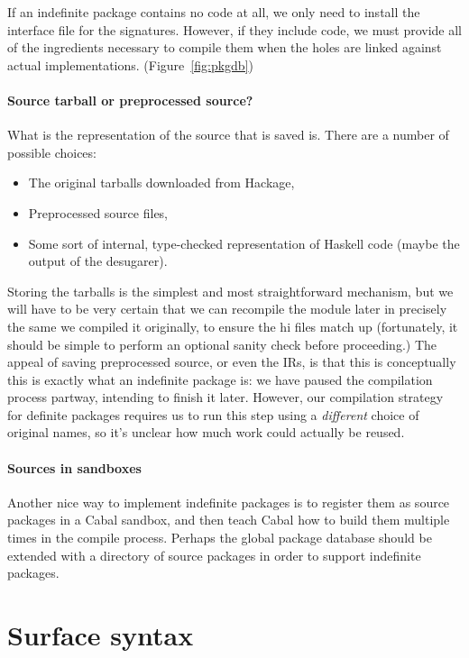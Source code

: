 \documentclass{article}
\begin{document}
If an indefinite package contains no code at all, we only need
to install the interface file for the signatures.  However, if
they include code, we must provide all of the
ingredients necessary to compile them when the holes are linked against
actual implementations.  (Figure~\ref{fig:pkgdb})

\paragraph{Source tarball or preprocessed source?}  What is the representation of the source that is saved is.  There
are a number of possible choices:

\begin{itemize}
    \item The original tarballs downloaded from Hackage,
    \item Preprocessed source files,
    \item Some sort of internal, type-checked representation of Haskell code (maybe the output of the desugarer).
\end{itemize}

Storing the tarballs is the simplest and most straightforward mechanism,
but we will have to be very certain that we can recompile the module
later in precisely the same we compiled it originally, to ensure the hi
files match up (fortunately, it should be simple to perform an optional
sanity check before proceeding.) The appeal of saving preprocessed
source, or even the IRs, is that this is conceptually this is exactly
what an indefinite package is: we have paused the compilation process
partway, intending to finish it later.  However, our compilation strategy
for definite packages requires us to run this step using a \emph{different}
choice of original names, so it's unclear how much work could actually be reused.

\paragraph{Sources in sandboxes}  Another nice way to implement indefinite
packages is to register them as source packages in a Cabal sandbox, and then
teach Cabal how to build them multiple times in the compile process.  Perhaps
the global package database should be extended with a directory of source
packages in order to support indefinite packages.

\section{Surface syntax}
\end{document}

